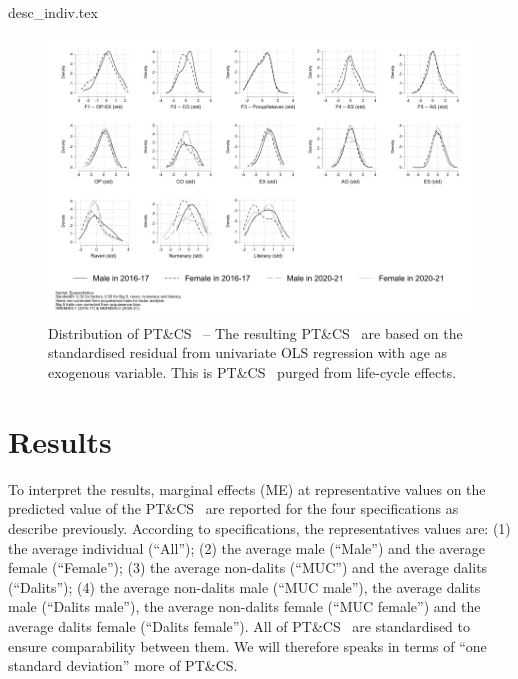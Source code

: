 \documentclass[a4paper, 11pt, onecolumn]{article}
\newcommand{\PTCS}{PT\&CS}
\begin{document}
{desc_indiv.tex}

\begin{figure}[ht]
\raggedright
\includegraphics[width=\textwidth]{INPUT/Kernel_PTCS_raw_new}
\caption{Distribution of \PTCS~ -- The resulting \PTCS~ are based on the standardised residual from univariate OLS regression with age as exogenous variable. This is \PTCS~ purged from life-cycle effects.}
\label{fig:PTCS}
\end{figure}



\section{Results}
\label{section:results}

To interpret the results, marginal effects (ME) at representative values on the predicted value of the \PTCS~ are reported for the four specifications as describe previously.
According to specifications, the representatives values are: (1) the average individual (``All''); (2) the average male (``Male'') and the average female (``Female''); (3) the average non-dalits (``MUC'') and the average dalits (``Dalits''); (4) the average non-dalits male (``MUC male''), the average dalits male (``Dalits male''), the average non-dalits female (``MUC female'') and the average dalits female (``Dalits female'').
All of \PTCS~ are standardised to ensure comparability between them.
We will therefore speaks in terms of ``one standard deviation'' more of \PTCS.
\end{document}
